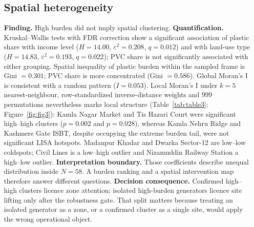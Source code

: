 \documentclass[12pt,a4paper]{article}
\begin{document}
\subsection{Spatial heterogeneity}
\label{sec:res-spatial}

\textbf{Finding.} High burden did not imply spatial clustering. \textbf{Quantification.} Kruskal--Wallis tests with FDR correction show a significant association of plastic share with income level ($H=14.00$, $\varepsilon^2=0.208$, $q=0.012$) and with land-use type ($H=14.83$, $\varepsilon^2=0.193$, $q=0.022$); PVC share is not significantly associated with either grouping. Spatial inequality of plastic burden within the sampled frame is Gini $=0.301$; PVC share is more concentrated (Gini $=0.586$). Global Moran's I is consistent with a random pattern ($I=0.053$). Local Moran's I under $k=5$ nearest-neighbour, row-standardized inverse-distance weights and 999 permutations nevertheless marks local structure (Table~\ref{tab:table3}; Figure~\ref{fig:fig3}): Kamla Nagar Market and Tis Hazari Court were significant high--high clusters ($p=0.002$ and $p=0.028$), whereas Kamla Nehru Ridge and Kashmere Gate ISBT, despite occupying the extreme burden tail, were not significant LISA hotspots. Madanpur Khadar and Dwarka Sector-12 are low--low coldspots; Civil Lines is a low--high outlier and Nizamuddin Railway Station a high--low outlier. \textbf{Interpretation boundary.} Those coefficients describe unequal distribution inside $N=58$. A burden ranking and a spatial intervention map therefore answer different questions. \textbf{Decision consequence.} Confirmed high--high clusters licence zone attention; isolated high-burden generators licence site lifting only after the robustness gate. That split matters because treating an isolated generator as a zone, or a confirmed cluster as a single site, would apply the wrong operational object.
\end{document}

